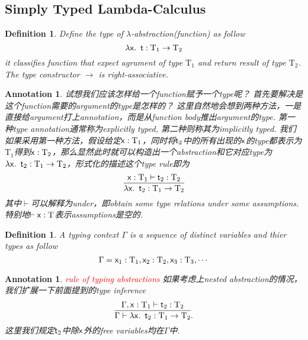 \documentclass{article}
\theoremstyle{plain}
\newtheorem{definition}[theorem]{Definition}
\newtheorem{annotation}[theorem]{Annotation}
\theoremstyle{nonumberplain}
\newcommand{\lam}[2]{\ensuremath{\lambda #1\ldotp~ #2}} %
\newcommand{\singletype}[1]{\text{#1}}
\newcommand{\termtype}[2]{\ensuremath{#1:#2}}
\newcommand{\term}[1]{\ensuremath\mathsf{#1}}
\newcommand{\redt}[1]{\textcolor{red}{#1}}
\begin{document}
\newpage
\subsection{Simply Typed Lambda-Calculus}

\begin{definition}
\rm Define the type of $\lambda$-abstraction(function) as follow
$$
\termtype{\lam{\term{x}}{\term{t}}}{\singletype{T}_1 \to \singletype{T}_2}
$$
it classifies function that expect agrument of type $\singletype{T}_1$ and return result of type $\singletype{T}_2$. The type constructor $\to$ is right-associative. 
\end{definition}


\begin{annotation}
\rm 试想我们应该怎样给一个function赋予一个type呢？ 首先要解决是这个function需要的argument的type是怎样的？ 这里自然地会想到两种方法，一是直接给argument打上annotation，而是从function body推出argument的type. 第一种type annotation通常称为explicitly typed, 第二种则称其为implicitly typed. 我们如果采用第一种方法，假设给定$\termtype{\term{x}}{\singletype{T}_1}$，同时将$\term{t}_2$中的所有出现的$\term{x}$的type都表示为$\singletype{T}_1$得到$\termtype{\term{x}}{\singletype{T}_2}$，那么显然此时就可以构造出一个abstraction和它对应type为$\termtype{\lam{\term{x}}{\term{t}_2}}{\singletype{T}_1 \to \singletype{T}_2}$，形式化的描述这个type rule即为
$$
\infer{\termtype{\lam{\term{x}}{\term{t}_2}}{\singletype{T}_1 \to \singletype{T}_2}}{\termtype{\term{x}}{\singletype{T}_1} \vdash \termtype{\term{t}_2}{\singletype{T}_2}}
$$
其中$\vdash$可以解释为under，即obtain some type relations under some assumptions. 特别地$\vdash \termtype{\term{x}}{\singletype{T}}$表示assumptions是空的. 
\end{annotation}

\begin{definition}
\rm A typing context $\Gamma$ is a sequence of distinct variables and thier types as follow
$$
\Gamma = \termtype{\term{x}_1}{\singletype{T}_1},\termtype{\term{x}_2}{\singletype{T}_2},\termtype{\term{x}_3}{\singletype{T}_3},\cdots
$$
\end{definition}

\begin{annotation}
\rm \redt{rule of typing abstractions} 如果考虑上nested abstraction的情况，我们扩展一下前面提到的type inference
$$
\infer{\Gamma \vdash \termtype{\lam{\term{x}}{\term{t}_2}}{\singletype{T}_1 \to \singletype{T}_2}}{\termtype{\Gamma,\term{x}}{\singletype{T}_1} \vdash \termtype{\term{t}_2}{\singletype{T}_2}}.
$$
这里我们规定$\term{t}_2$中除$\term{x}$外的free variables均在$\Gamma$中.
\end{annotation}
\end{document}
